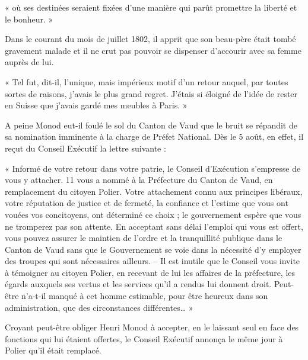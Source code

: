 \documentclass[french,twoside]{book} %
\newenvironment{quoteblock}%
  {\begin{quoting}}
  {\end{quoting}}
\newenvironment{quotebar}{%
    \def\FrameCommand{{\color{rubric!10!}\vrule width 0.5em} \hspace{0.9em}}%
    \def\OuterFrameSep{\itemsep} %
    \MakeFramed {\advance\hsize-\width \FrameRestore}
  }%
  {%
    \endMakeFramed
  }
\renewenvironment{quoteblock}%
  {%
    \savenotes
    \setstretch{0.9}
    \begin{quotebar}
  }
  {%
    \end{quotebar}
    \spewnotes
  }
\begin{document}
\begin{quoteblock}
\noindent « où ses destinées seraient fixées d’une manière qui parût promettre la liberté et le bonheur. »\end{quoteblock}

\noindent Dans le courant du mois de juillet 1802, il apprit que son beau-père était tombé gravement malade et il ne crut pas pouvoir se dispenser d’accourir avec sa femme auprès de lui.\par

\begin{quoteblock}
 \noindent « Tel fut, dit-il, l’unique, mais impérieux motif d’un retour auquel, par toutes sortes de raisons, j’avais le plus grand regret. J’étais si éloigné de l’idée de rester en Suisse que j’avais gardé mes meubles à Paris. »
 \end{quoteblock}

\noindent A peine Monod eut-il foulé le sol du Canton de Vaud que le bruit se répandit de sa nomination imminente à la charge de Préfet National. Dès le 5 août, en effet, il reçut du Conseil Exécutif la lettre suivante :\par

\begin{quoteblock}
 \noindent « Informé de votre retour dans votre patrie, le Conseil d’Exécution s’empresse de vous y attacher. 11 vous a nommé à la Préfecture du Canton de Vaud, en remplacement du citoyen Polier. Votre attachement connu aux principes libéraux, votre réputation de justice et de fermeté, la confiance et l’estime que vous ont vouées vos concitoyens, ont déterminé ce choix ; le gouvernement espère que vous ne tromperez pas son attente. En acceptant sans délai l’emploi qui vous est offert, vous pouvez assurer le maintien de l’ordre et la tranquillité publique dans le Canton de Vaud sans que le Gouvernement se voie dans la nécessité d’y employer des troupes qui sont nécessaires ailleurs. – Il est inutile que le Conseil vous invite à témoigner au citoyen Polier, en recevant de lui les affaires de la préfecture, les égards auxquels ses vertus et les services qu’il a rendus lui donnent droit. Peut-être n’a-t-il manqué à cet homme estimable, pour être heureux dans son administration, que des circonstances différentes… »
 \end{quoteblock}

\noindent Croyant peut-être obliger Henri Monod à accepter, en le laissant seul en face des fonctions qui lui étaient offertes, le Conseil Exécutif annonça le même jour à Polier qu’il était remplacé.\par
\end{document}
